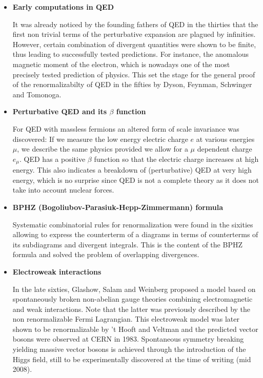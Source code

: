 \documentclass[12pt,here,feynmf]{article}
\begin{document}
\begin{itemize}
\item
{\bf Early computations in QED}

It was already noticed by the founding fathers of QED in the thirties that the first non trivial terms of the perturbative expansion are plagued by infinities. However, certain combination of divergent quantities were shown to be finite, thus leading to successfully tested predictions. For instance, the anomalous magnetic moment of the electron, which is nowadays one of the most precisely tested prediction of physics. This set the stage for the general proof of the renormalizabilty of QED in the fifties by  Dyson, Feynman, Schwinger and Tomonoga.

\item
{\bf Perturbative QED  and its $\beta$ function}

For QED with massless fermions an altered form of scale invariance was discovered: If we measure the low energy electric charge $e$ at various energies $\mu$, we describe the same physics provided we allow for a $\mu$ dependent charge $e_{\mu}$. QED has a positive $\beta$ function so that the electric charge increases at high energy. This also indicates a breakdown of (perturbative) QED at very high energy, which is no surprise since QED is not a complete theory as it does not take into account nuclear forces.

\item
{\bf BPHZ (Bogoliubov-Parasiuk-Hepp-Zimmermann) formula}
 
Systematic  combinatorial rules for renormalization were found in the sixities allowing to express the counterterm of a diagrams in terms of counterterms of  its subdiagrams and divergent integrals. This is the content of the BPHZ formula and solved the problem of overlapping divergences.

\item
{\bf Electroweak interactions}

In the late sixties, Glashow, Salam and Weinberg proposed a model based on spontaneously broken non-abelian gauge theories combining electromagnetic and weak interactions. Note that the latter was previously described by the non renormalizable Fermi Lagrangian. This electroweak model was later shown to be renormalizable by 't Hooft and Veltman and the predicted vector bosons were observed at CERN in 1983. Spontaneous symmetry breaking yielding massive vector bosons is achieved through the introduction of the Higgs field, still to be experimentally discovered at the time of writing (mid 2008). 


\end{itemize}
\end{document}
